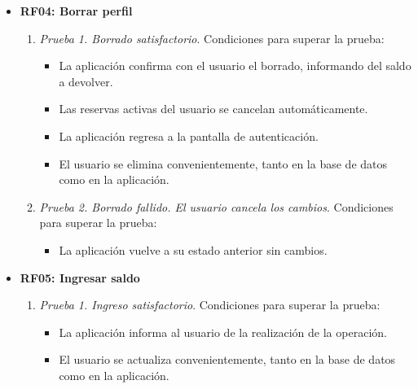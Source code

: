 \begin{itemize}
	\item \textbf{RF04: Borrar perfil}
	\begin{enumerate}
		\item \textit{Prueba 1. Borrado satisfactorio}. Condiciones para superar la prueba:
		\begin{itemize}
			\item La aplicación confirma con el usuario el borrado, informando del saldo a devolver.
			\item Las reservas activas del usuario se cancelan automáticamente.
			\item La aplicación regresa a la pantalla de autenticación.
			\item El usuario se elimina convenientemente, tanto en la base de datos como en la aplicación.
		\end{itemize}
		\item \textit{Prueba 2. Borrado fallido. El usuario cancela los cambios}. Condiciones para superar la prueba:
		\begin{itemize}
			\item La aplicación vuelve a su estado anterior sin cambios.
		\end{itemize}
	\end{enumerate}
	
	\item \textbf{RF05: Ingresar saldo}
	\begin{enumerate}
		\item \textit{Prueba 1. Ingreso satisfactorio}. Condiciones para superar la prueba:
		\begin{itemize}
			\item La aplicación informa al usuario de la realización de la operación.
			\item El usuario se actualiza convenientemente, tanto en la base de datos como en la aplicación.
		\end{itemize}
	\end{enumerate}
	

\end{itemize}
